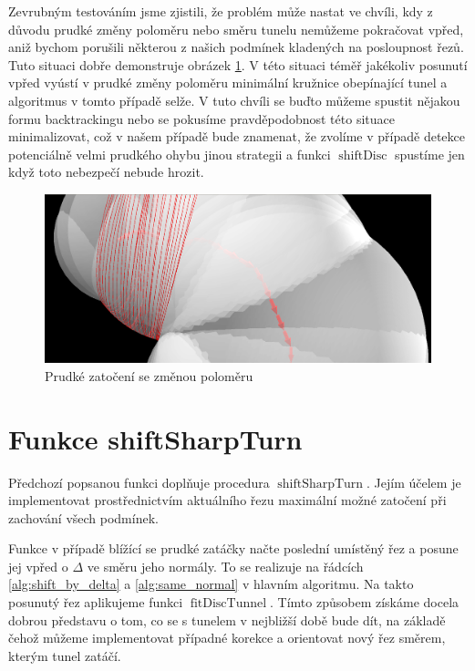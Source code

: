 Zevrubným testováním jsme zjistili, že problém může nastat ve chvíli, kdy
z důvodu prudké změny poloměru nebo směru tunelu nemůžeme pokračovat vpřed, aniž
bychom porušili některou z našich podmínek kladených na posloupnost řezů.
Tuto situaci dobře demonstruje obrázek \ref{fig:sharp_curve}. V této situaci
téměř jakékoliv posunutí vpřed vyústí v prudké změny poloměru minimální kružnice
obepínající tunel a algoritmus v tomto případě selže. V tuto chvíli se buďto
můžeme spustit nějakou formu backtrackingu nebo se pokusíme pravděpodobnost
této situace minimalizovat, což v našem případě bude znamenat, že zvolíme v případě
detekce potenciálně velmi prudkého ohybu jinou strategii a funkci
$ \operatorname{shiftDisc} $ spustíme jen když toto nebezpečí nebude hrozit.

\begin{figure}[ht]
    \centering
    \includegraphics[width=\textwidth]{img/sharp_curve.png}
    \caption{Prudké zatočení se změnou poloměru}
  \centering
  \label{fig:sharp_curve}
\end{figure}





\section{Funkce shiftSharpTurn} \label{subsec:shift_sharp_turn}
Předchozí popsanou funkci doplňuje procedura $ \operatorname{shiftSharpTurn} $.
Jejím účelem je implementovat prostřednictvím aktuálního řezu maximální možné
zatočení při zachování všech podmínek.

Funkce v případě blížící se prudké
zatáčky načte poslední umístěný řez a posune jej vpřed o $ \Delta $ ve směru
jeho normály. To se realizuje na řádcích \ref{alg:shift_by_delta} a
\ref{alg:same_normal} v hlavním algoritmu. Na takto posunutý řez aplikujeme
funkci $ \operatorname{fitDiscTunnel} $. Tímto způsobem získáme docela dobrou
představu o tom, co se s tunelem v nejbližší době bude dít, na základě čehož
můžeme implementovat případné korekce a orientovat nový řez směrem, kterým
tunel zatáčí.

